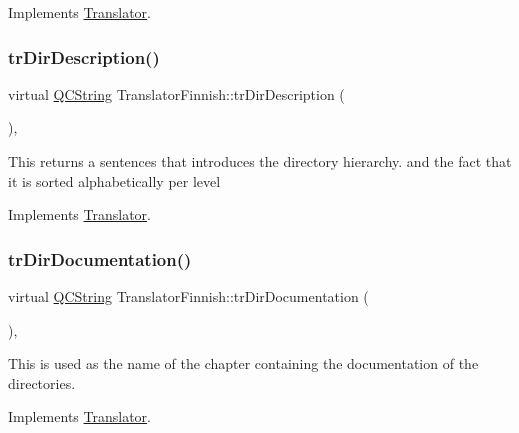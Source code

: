 Implements \mbox{\hyperlink{class_translator}{Translator}}.

\mbox{\label{class_translator_finnish_ad9efba52264b831e1b2ac1e0daad9dab}} 
\subsubsection{\texorpdfstring{trDirDescription()}{trDirDescription()}}
{\footnotesize\ttfamily virtual \mbox{\hyperlink{class_q_c_string}{Q\+C\+String}} Translator\+Finnish\+::tr\+Dir\+Description (\begin{DoxyParamCaption}{ }\end{DoxyParamCaption})\hspace{0.3cm}{\ttfamily [inline]}, {\ttfamily [virtual]}}

This returns a sentences that introduces the directory hierarchy. and the fact that it is sorted alphabetically per level 

Implements \mbox{\hyperlink{class_translator}{Translator}}.

\mbox{\label{class_translator_finnish_a9905a8778af8b60802848330d7b7f4c9}} 
\subsubsection{\texorpdfstring{trDirDocumentation()}{trDirDocumentation()}}
{\footnotesize\ttfamily virtual \mbox{\hyperlink{class_q_c_string}{Q\+C\+String}} Translator\+Finnish\+::tr\+Dir\+Documentation (\begin{DoxyParamCaption}{ }\end{DoxyParamCaption})\hspace{0.3cm}{\ttfamily [inline]}, {\ttfamily [virtual]}}

This is used as the name of the chapter containing the documentation of the directories. 

Implements \mbox{\hyperlink{class_translator}{Translator}}.

\mbox{\label{class_translator_finnish_afdd9497b9466a4eb5d89e3332575b311}} 
